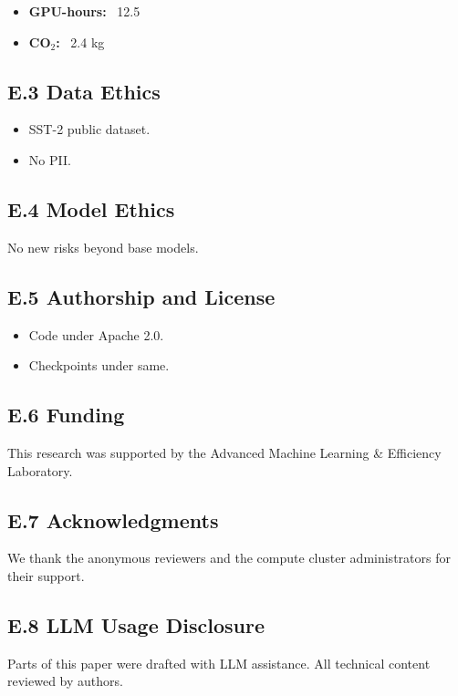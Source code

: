 \begin{itemize}
\item \textbf{GPU-hours:} ~12.5
\item \textbf{CO$_2$:} ~2.4 kg

\end{itemize}
\subsection{E.3 Data Ethics}

\begin{itemize}
\item SST-2 public dataset.
\item No PII.

\end{itemize}
\subsection{E.4 Model Ethics}

No new risks beyond base models.

\subsection{E.5 Authorship and License}

\begin{itemize}
\item Code under Apache 2.0.
\item Checkpoints under same.

\end{itemize}
\subsection{E.6 Funding}

This research was supported by the Advanced Machine Learning \& Efficiency Laboratory.

\subsection{E.7 Acknowledgments}

We thank the anonymous reviewers and the compute cluster administrators for their support.

\subsection{E.8 LLM Usage Disclosure}

Parts of this paper were drafted with LLM assistance. All technical content 
reviewed by authors.

